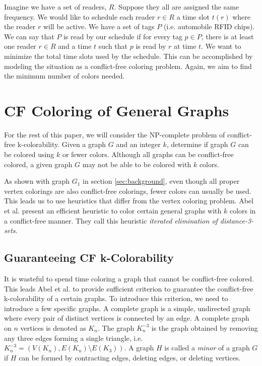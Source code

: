 \documentclass{sig-alternate}
\begin{document}
Imagine we have a set of readers, $R$. Suppose they all are assigned the same frequency. We would like to schedule each reader $r \in R$ a time slot $t(r)$ where the reader $r$ will be active. We have a set of tags $P$ (i.e. automobile RFID chips). We can say that $P$ is read by our schedule if for every tag $p \in P$, there is at least one reader $r \in R$ and a time $t$ such that $p$ is read by $r$ at time $t$. We want to minimize the total time slots used by the schedule. This can be accomplished by modeling the situation as a conflict-free coloring problem. Again, we aim to find the minimum number of colors needed. \cite{cheilaris2014strong, smorodinsky2013conflict}

\section{CF Coloring of General Graphs}
For the rest of this paper, we will consider the NP-complete problem of conflict-free k-colorability. Given a graph $G$ and an integer $k$, determine if graph $G$ can be colored using $k$ or fewer colors. Although all graphs can be conflict-free colored, a given graph $G$ may not be able to be colored with $k$ colors.

As shown with graph $G_1$ in section \ref{sec:background}, even though all proper vertex colorings are also conflict-free colorings, fewer colors can usually be used. This leads us to use heuristics that differ from the vertex coloring problem. Abel et al. \cite{abel2017three} present an efficient heuristic to color certain general graphs with $k$ colors in a conflict-free manner. They call this heuristic \emph{iterated elimination of distance-3-sets}.

\subsection{Guaranteeing CF k-Colorability}
It is wasteful to spend time coloring a graph that cannot be conflict-free colored. This leads Abel et al. to provide sufficient criterion to guarantee the conflict-free k-colorability of a certain graphs. To introduce this criterion, we need to introduce a few specific graphs. A complete graph is a simple, undirected graph where every pair of distinct vertices is connected by an edge. A complete graph on $n$ vertices is denoted as $K_n$. The graph $K_n^{-3}$ is the graph obtained by removing any three edges forming a single triangle, i.e. \(K_n^{-3} =  \left ( V(K_n), E(K_n) \setminus E(K_3) \right ) \). A graph $H$ is called a \emph{minor} of a graph $G$ if $H$ can be formed by contracting edges, deleting edges, or deleting vertices. \cite{abel2017three,bondy1976graph}
\end{document}
